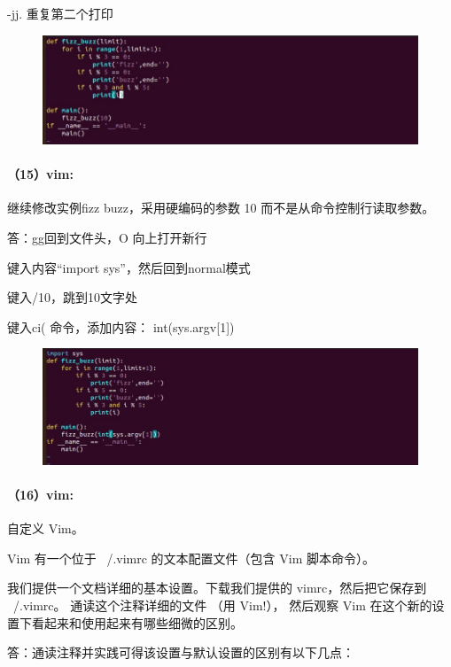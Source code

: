 \documentclass[a4paper, 12pt]{article}
\begin{document}
	-jj. 重复第二个打印
	
	\begin{figure}[H]
		\centering
		\includegraphics[width=1\textwidth]{037.jpg}
	\end{figure}
	
	\paragraph{（15）vim:}
	继续修改实例fizz buzz，采用硬编码的参数 10 而不是从命令控制行读取参数。
	
	答：gg回到文件头，O 向上打开新行
	
	键入内容“import sys”，然后回到normal模式
	
	键入/10，跳到10文字处
	
	键入ci( 命令，添加内容： int(sys.argv[1])
	
	\begin{figure}[H]
		\centering
		\includegraphics[width=1\textwidth]{038.jpg}
	\end{figure}
	
	\paragraph{（16）vim:}
	自定义 Vim。
	
	Vim 有一个位于 ~/.vimrc 的文本配置文件（包含 Vim 脚本命令）。
	
	我们提供一个文档详细的基本设置。下载我们提供的 vimrc，然后把它保存到 ~/.vimrc。 通读这个注释详细的文件 （用 Vim!）， 然后观察 Vim 在这个新的设置下看起来和使用起来有哪些细微的区别。
	
	答：通读注释并实践可得该设置与默认设置的区别有以下几点：
	
\end{document}
